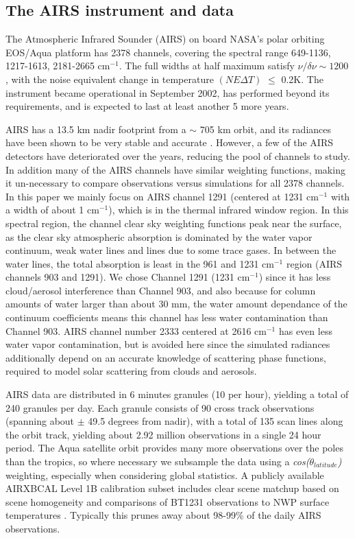\documentclass[agupp]{aguplus}              %
\newcommand{\wn}{cm$^{-1}$\xspace}
\begin{document}
\begin{article}
\subsection{The AIRS instrument and data} The Atmospheric Infrared
Sounder (AIRS) on board NASA's polar orbiting EOS/Aqua platform has
2378 channels, covering the spectral range 649-1136, 1217-1613,
2181-2665 \wn. The full widths at half maximum satisfy $\nu/\delta\nu
\sim 1200$, with the noise equivalent change in temperature $(NE
\Delta T)$ $\le$ 0.2K.  The instrument became operational in September
2002, has performed beyond its requirements, and is expected to last
at least another 5 more years.  

AIRS has a 13.5 km nadir footprint from a $\sim$ 705 km orbit, and its
radiances have been shown to be very stable and accurate
\citep{aum:06}. However, a few of the AIRS detectors have deteriorated
over the years, reducing the pool of channels to study. In addition
many of the AIRS channels have similar weighting functions, making it
un-necessary to compare observations versus simulations for all 2378
channels. In this paper we mainly focus on AIRS channel 1291 (centered
at 1231 \wn with a width of about 1 \wn), which is in the thermal
infrared window region. In this spectral region, the channel clear sky
weighting functions peak near the surface, as the clear sky
atmospheric absorption is dominated by the water vapor continuum, weak
water lines and lines due to some trace gases. In between the water
lines, the total absorption is least in the 961 and 1231 \wn region
(AIRS channels 903 and 1291). We chose Channel 1291 (1231 \wn) since
it has less cloud/aerosol interference than Channel 903, and also
because for column amounts of water larger than about 30 mm, the water
amount dependance of the continuum coefficients means this channel has
less water contamination than Channel 903.  AIRS channel number 2333
centered at 2616 \wn has even less water vapor contamination, but is
avoided here since the simulated radiances additionally depend on an
accurate knowledge of scattering phase functions, required to model
solar scattering from clouds and aerosols.

AIRS data are distributed in 6 minutes granules (10 per hour),
yielding a total of 240 granules per day. Each granule consists of 90
cross track observations (spanning about $\pm$ 49.5 degrees from nadir),
with a total of 135 scan lines along the orbit track, yielding about
2.92 million observations in a single 24 hour period. The Aqua
satellite orbit provides many more observations over the poles than
the tropics, so where necessary we subsample the data using a
\emph{cos($\theta_{latitude}$)} weighting, especially when considering
global statistics. A publicly available AIRXBCAL Level 1B
calibration subset includes clear scene matchup based on scene
homogeneity and comparisons of BT1231 observations to NWP surface
temperatures \citep{aum:07}. Typically this prunes away about 98-99\%
of the daily AIRS observations.


\end{article}
\end{document}
